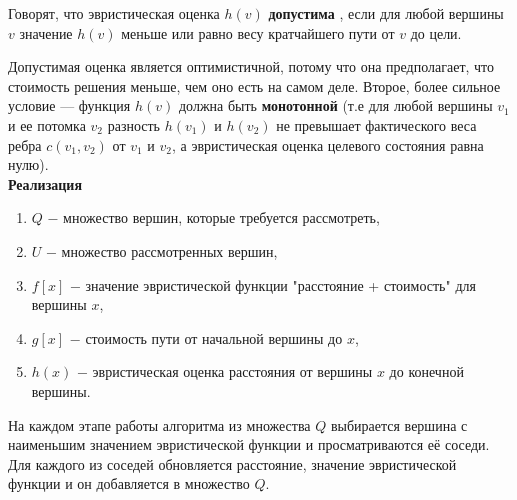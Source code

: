         \begin{definition}
            Говорят, что эвристическая оценка $h(v)$ \textbf{допустима} , если для любой вершины $v$ значение $h(v)$ меньше или равно весу кратчайшего пути от $v$ до цели.
        \end{definition}
        Допустимая оценка является оптимистичной, потому что она предполагает, что стоимость решения меньше, чем оно есть на самом деле.
        Второе, более сильное условие — функция $h(v)$ должна быть \textbf{монотонной} (т.е для любой вершины $v_1$ и ее потомка $v_2$ разность $h(v_1)$ и $h(v_2)$ не превышает фактического веса ребра $c(v_1, v_2)$ от $v_1$ и $v_2$, а эвристическая оценка целевого состояния равна нулю).\\

        \textbf{Реализация}
        \begin{enumerate}
                \item $Q$ $-$ множество вершин, которые требуется рассмотреть,
                \item $U$ $-$ множество рассмотренных вершин,
                \item $f[x]$ $-$ значение эвристической функции "расстояние + стоимость" для вершины $x$,
                \item $g[x]$ $-$ стоимость пути от начальной вершины до $x$,
                \item $h(x)$ $-$ эвристическая оценка расстояния от вершины $x$ до конечной вершины.
        \end{enumerate}
        На каждом этапе работы алгоритма из множества $Q$ выбирается вершина с наименьшим значением эвристической функции и просматриваются её соседи. Для каждого из соседей обновляется расстояние, значение эвристической функции и он добавляется в множество $Q$.
